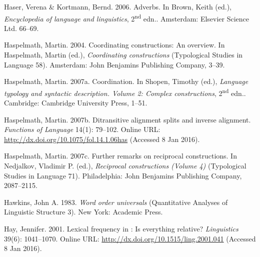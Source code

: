 \begin{styleCitaviBibliographyEntry}
Haser, Verena \& Kortmann, Bernd. 2006. Adverbs. In Brown, Keith (ed.), \textit{Encyclopedia of language and linguistics}, 2\textsuperscript{nd} edn.. Amsterdam: Elsevier Science Ltd. 66–69.
\end{styleCitaviBibliographyEntry}

\begin{styleCitaviBibliographyEntry}
Haspelmath, Martin. 2004. Coordinating constructions: An overview. In Haspelmath, Martin (ed.), \textit{Coordinating constructions} (Typological Studies in Language 58). Amsterdam: John Benjamins Publishing Company, 3–39.
\end{styleCitaviBibliographyEntry}

\begin{styleCitaviBibliographyEntry}
Haspelmath, Martin. 2007a. Coordination. In Shopen, Timothy (ed.), \textit{Language typology and syntactic description. Volume 2: Complex constructions}, 2\textsuperscript{nd} edn.. Cambridge: Cambridge University Press, 1–51.
\end{styleCitaviBibliographyEntry}

\begin{styleCitaviBibliographyEntry}
Haspelmath, Martin. 2007b. Ditransitive alignment splits and inverse alignment. \textit{Functions of Language} 14(1): 79–102. Online URL: \url{http://dx.doi.org/10.1075/fol.14.1.06has} (Accessed 8 Jan 2016).
\end{styleCitaviBibliographyEntry}

\begin{styleCitaviBibliographyEntry}
Haspelmath, Martin. 2007c. Further remarks on reciprocal constructions. In Nedjalkov, Vladimir P. (ed.), \textit{Reciprocal constructions (Volume 4)} (Typological Studies in Language 71). Philadelphia: John Benjamins Publishing Company, 2087–2115.
\end{styleCitaviBibliographyEntry}

\begin{styleCitaviBibliographyEntry}
Hawkins, John A. 1983. \textit{Word order universals} (Quantitative Analyses of Linguistic Structure 3). New York: Academic Press.
\end{styleCitaviBibliographyEntry}

\begin{styleCitaviBibliographyEntry}
Hay, Jennifer. 2001. Lexical frequency in : Is everything relative? \textit{Linguistics} 39(6): 1041–1070. Online URL: \url{http://dx.doi.org/10.1515/ling.2001.041} (Accessed 8 Jan 2016).
\end{styleCitaviBibliographyEntry}

